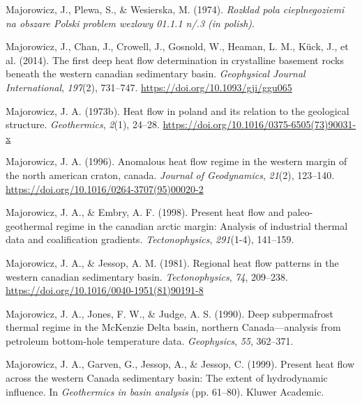 \begin{CSLReferences}{1}{1}
\leavevmode{}%
Majorowicz, J., Plewa, S., \& Wesierska, M. (1974). \emph{Rozklad pola cieplnegoziemi na obszare {Polski} problem wezlowy 01.1.1 n/.3 (in polish)}.

\leavevmode{}%
Majorowicz, J., Chan, J., Crowell, J., Gosnold, W., Heaman, L. M., Kück, J., et al. (2014). The first deep heat flow determination in crystalline basement rocks beneath the western canadian sedimentary basin. \emph{Geophysical Journal International}, \emph{197}(2), 731--747. \url{https://doi.org/10.1093/gji/ggu065}

\leavevmode{}%
Majorowicz, J. A. (1973b). Heat flow in poland and its relation to the geological structure. \emph{Geothermics}, \emph{2}(1), 24--28. \url{https://doi.org/10.1016/0375-6505(73)90031-x}

\leavevmode{}%
Majorowicz, J. A. (1996). Anomalous heat flow regime in the western margin of the north american craton, canada. \emph{Journal of Geodynamics}, \emph{21}(2), 123--140. \url{https://doi.org/10.1016/0264-3707(95)00020-2}

\leavevmode{}%
Majorowicz, J. A., \& Embry, A. F. (1998). Present heat flow and paleo-geothermal regime in the canadian arctic margin: Analysis of industrial thermal data and coalification gradients. \emph{Tectonophysics}, \emph{291}(1-4), 141--159.

\leavevmode{}%
Majorowicz, J. A., \& Jessop, A. M. (1981). Regional heat flow patterns in the western canadian sedimentary basin. \emph{Tectonophysics}, \emph{74}, 209--238. \url{https://doi.org/10.1016/0040-1951(81)90191-8}

\leavevmode{}%
Majorowicz, J. A., Jones, F. W., \& Judge, A. S. (1990). Deep subpermafrost thermal regime in the {McKenzie Delta} basin, northern {Canada}---analysis from petroleum bottom-hole temperature data. \emph{Geophysics}, \emph{55}, 362--371.

\leavevmode{}%
Majorowicz, J. A., Garven, G., Jessop, A., \& Jessop, C. (1999). Present heat flow across the western {Canada} sedimentary basin: The extent of hydrodynamic influence. In \emph{Geothermics in basin analysis} (pp. 61--80). Kluwer Academic.


\end{CSLReferences}
